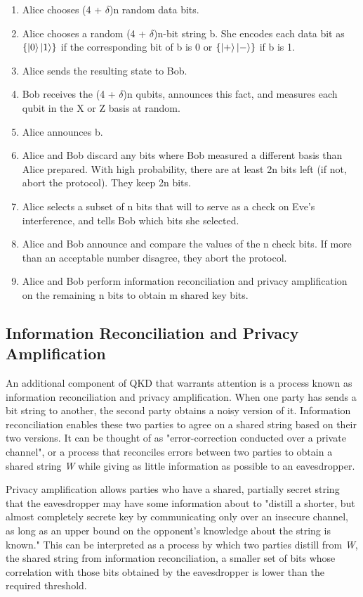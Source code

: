 \documentclass[12]{amsart}
\begin{document}
\begin{enumerate}
\item Alice chooses (4 + $\delta$)n random data bits.
\item Alice chooses a random (4 + $\delta$)n-bit string b. She encodes each data bit as $\{\ket{0} \ket{1}\}$ if the corresponding bit of b is 0 or $\{\ket{+} \ket{-}\}$ if b is 1.
\item Alice sends the resulting state to Bob.
\item Bob receives the (4 + $\delta$)n qubits, announces this fact, and measures each qubit in the X or Z basis at random.
\item Alice announces b.
\item Alice and Bob discard any bits where Bob measured a different basis than Alice prepared. With high probability, there are at least 2n bits left (if not, abort the protocol). They keep 2n bits.
\item Alice selects a subset of n bits that will to serve as a check on Eve's interference, and tells Bob which bits she selected.
\item Alice and Bob announce and compare the values of the n check bits. If more than an acceptable number disagree, they abort the protocol.
\item Alice and Bob perform information reconciliation and privacy amplification on the remaining n bits to obtain m shared key bits.
\end{enumerate}

\subsection{Information Reconciliation and Privacy Amplification}

An additional component of QKD that warrants attention is a process known as information reconciliation and privacy amplification. When one party has sends a bit string to another, the second party obtains a noisy version of it. Information reconciliation enables these two parties to agree on a shared string based on their two versions. It can be thought of as "error-correction conducted over  a private channel"\cite{text}, or a process that reconciles errors between two parties to obtain a shared string \textit{W} while giving as little information as possible to an eavesdropper.\cite{text}

Privacy amplification allows parties who have a shared, partially secret string that the eavesdropper may have some information about to "distill a shorter, but almost completely secrete key by communicating only over an insecure channel, as long as an upper bound on the opponent’s knowledge about the string is known."\cite{priv} This can be interpreted as a process by which two parties distill from \textit{W}, the shared string from information reconciliation,  a smaller set of bits whose correlation with those bits obtained by the eavesdropper is lower than the required threshold. \cite{text}
\end{document}
